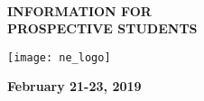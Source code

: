 
\begin{center}
\-\\
	\begin{spacing}{2.5}
	\textbf{\Huge INFORMATION FOR \\ PROSPECTIVE STUDENTS}
	\end{spacing}

	\vspace{1cm}

	\texttt{[image: ne\_logo]}

	\vspace{2cm}

	\textbf{\huge February 21-23, 2019}
\end{center}
